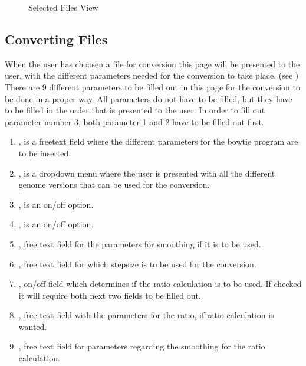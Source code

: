 \begin{figure}[h]
\caption{Selected Files View}
\label{fig:and_selected_man}
\end{figure}
\FloatBarrier


\subsection{Converting Files}
When the user has choosen a file for conversion this page will be presented to the user, with the different parameters needed for the conversion to take place. (see )	\\
\newline
There are 9 different parameters to be filled out in this page for the conversion to be done in a proper way. All parameters do not have to be filled, but they have to be filled in the order that is presented to the user. In order to fill out parameter number 3, both parameter 1 and 2 have to be filled out first.

\begin{enumerate}
	\item {}, is a freetext field where the different parameters for the bowtie program are to be inserted.
    \item {}, is a dropdown menu where the user is presented with all the different genome versions that can be used for the conversion.
    \item {}, is an on/off option.
    \item {}, is an on/off option. 
    \item {}, free text field for the parameters for smoothing if it is to be used.
    \item {}, free text field for which stepsize is to be used for the conversion.
    \item {}, on/off field which determines if the ratio calculation is to be used. If checked it will require both next two fields to be filled out.
    \item {}, free text field with the parameters for the ratio, if ratio calculation is wanted.
    \item {}, free text field for parameters regarding the smoothing for the ratio calculation. 
    

\end{enumerate}
\FloatBarrier



